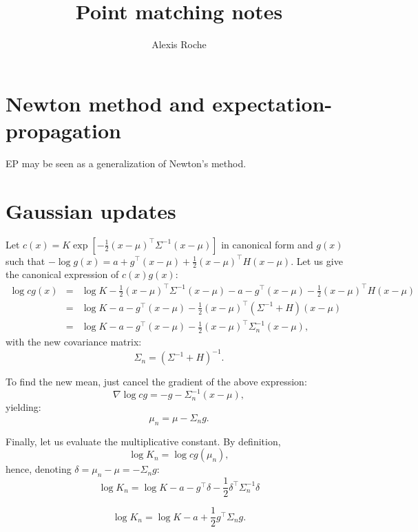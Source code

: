 \documentclass{article}
\title{Point matching notes}
\author{Alexis Roche}
\begin{document}
\maketitle


\section{Newton method and expectation-propagation}

EP may be seen as a generalization of Newton's method.


\section{Gaussian updates}

Let $c(x)=K \exp[-\frac{1}{2} (x-\mu)^\top \Sigma^{-1} (x-\mu)]$ in canonical form and $g(x)$ such that $-\log g(x)=a + g^\top (x-\mu) + \frac{1}{2} (x-\mu)^\top H (x-\mu)$. Let us give the canonical expression of $c(x)g(x)$:
\begin{eqnarray*}
\log cg (x)
& = & 
\log K -\frac{1}{2} (x-\mu)^\top \Sigma^{-1} (x-\mu)
- a - g^\top (x-\mu) - \frac{1}{2} (x-\mu)^\top H (x-\mu) \\
& = & 
\log K -a - g^\top (x-\mu) - \frac{1}{2} (x-\mu)^\top (\Sigma^{-1} + H) (x-\mu) \\
& = & 
\log K -a - g^\top (x-\mu) - \frac{1}{2} (x-\mu)^\top \Sigma_n^{-1} (x-\mu),
\end{eqnarray*}
with the new covariance matrix:
$$
\Sigma_n = (\Sigma^{-1} + H)^{-1}
.
$$

To find the new mean, just cancel the gradient of the above expression:
$$
\nabla \log cg 
= 
- g - \Sigma_n^{-1} (x-\mu),
$$
yielding:
$$
\mu_n = \mu - \Sigma_n g
.
$$

Finally, let us evaluate the multiplicative constant. By definition,
$$
\log K_n = \log cg(\mu_n),
$$
hence, denoting $\delta=\mu_n-\mu=-\Sigma_n g$:
$$
\log K_n = \log K -a - g^\top \delta - \frac{1}{2} \delta^\top \Sigma_n^{-1} \delta
$$

$$
\log K_n = \log K -a + \frac{1}{2} g^\top \Sigma_n g.
$$
\end{document}
